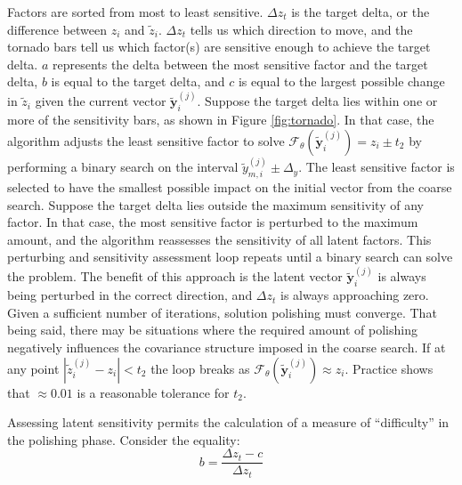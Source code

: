 Factors are sorted from most to least sensitive. $\Delta z_{t}$ is the target delta, or the difference between $z_{i}$ and $\tilde{z}_{i}$. $\Delta z_{t}$ tells us which direction to move, and the tornado bars tell us which factor(s) are sensitive enough to achieve the target delta. $a$ represents the delta between the most sensitive factor and the target delta, $b$ is equal to the target delta, and $c$ is equal to the largest possible change in $\tilde{z}_{i}$ given the current vector $\tilde{\mathbf{y}}_{i}^{(j)}$. Suppose the target delta lies within one or more of the sensitivity bars, as shown in Figure \ref{fig:tornado}. In that case, the algorithm adjusts the least sensitive factor to solve $\mathcal{F}_{\theta}(\tilde{\mathbf{y}}_{i}^{(j)}) = z_{i} \pm t_{2}$ by performing a binary search \citep{nowak2008generalized} on the interval $\tilde{y}_{m, i}^{(j)} \pm \Delta_{y}$. The least sensitive factor is selected to have the smallest possible impact on the initial vector from the coarse search. Suppose the target delta lies outside the maximum sensitivity of any factor. In that case, the most sensitive factor is perturbed to the maximum amount, and the algorithm reassesses the sensitivity of all latent factors. This perturbing and sensitivity assessment loop repeats until a binary search can solve the problem. The benefit of this approach is the latent vector $\tilde{\mathbf{y}}_{i}^{(j)}$ is always being perturbed in the correct direction, and $\Delta z_{t}$ is always approaching zero. Given a sufficient number of iterations, solution polishing must converge. That being said, there may be situations where the required amount of polishing negatively influences the covariance structure imposed in the coarse search. If at any point $|\tilde{z}_{i}^{(j)} - z_{i}| < t_{2}$ the loop breaks as $\mathcal{F}_{\theta}(\tilde{\mathbf{y}}_{i}^{(j)}) \approx z_{i}$. Practice shows that $\approx 0.01$ is a reasonable tolerance for $t_2$.

Assessing latent sensitivity permits the calculation of a measure of ``difficulty'' in the polishing phase. Consider the equality:
\begin{equation}
    b = \frac{\Delta z_{t} - c}{\Delta z_{t}}
    \label{eq:aoverb}
\end{equation}

